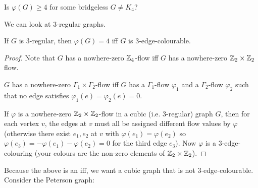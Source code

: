 \documentclass[main.tex]{subfiles}
\begin{document}
\begin{question*}
  Is $\varphi(G)\geq 4$ for some bridgeless $G\neq K_4$?
\end{question*}
We can look at 3-regular graphs.
\begin{proposition}
  If $G$ is 3-regular, then $\varphi(G) = 4$ iff $G$ is 3-edge-colourable.
\end{proposition}
\begin{proof}
  Note that $G$ has a nowhere-zero $\mathbb Z_4$-flow iff $G$ has a nowhere-zero
  $\mathbb Z_2\times\mathbb Z_2$ flow.
  \begin{proposition}
    $G$ has a nowhere-zero $\Gamma_1\times\Gamma_2$-flow iff $G$ has a
    $\Gamma_1$-flow $\varphi_1$ and a $\Gamma_2$-flow $\varphi_2$ such that
    no edge satisfies $\varphi_1(e) = \varphi_2(e) = 0$.
  \end{proposition}
  If $\varphi$ is a nowhere-zero $\mathbb Z_2\times\mathbb Z_2$-flow in a cubic (i.e. 3-regular)
  graph $G$, then for each vertex $v$, the edges at $v$ must all be assigned
  different flow values by $\varphi$ (otherwise there exist $e_1,e_2$ at $v$
  with $\varphi(e_1) = \varphi(e_2)$ so
  $\varphi(e_3) = -\varphi(e_1) - \varphi(e_2) = 0$ for the third edge $e_3$).
  Now $\varphi$ is a 3-edge-colouring (your colours are the non-zero elements
  of $\mathbb Z_2\times\mathbb Z_2$).
\end{proof}
Because the above is an iff, we want a cubic graph that is not 3-edge-colourable.
Consider the Peterson graph:
\begin{center}
\end{center}
\end{document}
